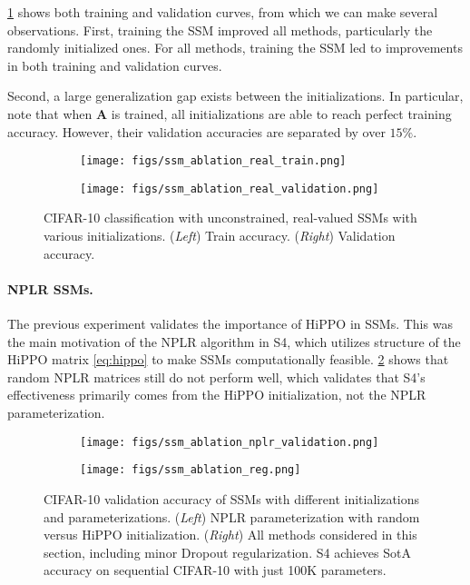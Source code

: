 \cref{fig:ssm-ablation-real} shows both training and validation curves, from which we can make several observations.
First, training the SSM improved all methods, particularly the randomly initialized ones.
For all methods, training the SSM led to improvements in both training and validation curves.

Second, a large generalization gap exists between the initializations.
In particular, note that when \( \bm{A} \) is trained, all initializations are able to reach perfect training accuracy.
However, their validation accuracies are separated by over \( 15\% \).

\begin{figure}[!ht]
\begin{subfigure}{.5\linewidth}%
    \centering
    \texttt{[image: figs/ssm\_ablation\_real\_train.png]}
\end{subfigure}
\begin{subfigure}{.5\linewidth}%
    \centering
    \texttt{[image: figs/ssm\_ablation\_real\_validation.png]}
\end{subfigure}
\caption{CIFAR-10 classification with unconstrained, real-valued SSMs with various initializations. (\emph{Left}) Train accuracy. (\emph{Right}) Validation accuracy.}
\label{fig:ssm-ablation-real}
\end{figure}

\paragraph{NPLR SSMs.}
The previous experiment validates the importance of HiPPO in SSMs.
This was the main motivation of the NPLR algorithm in S4,
which utilizes structure of the HiPPO matrix \eqref{eq:hippo} to make SSMs computationally feasible.
\cref{fig:ssm-ablation-nplr} shows that random NPLR matrices still do not perform well,
which validates that S4's effectiveness primarily comes from the HiPPO initialization, not the NPLR parameterization.

\begin{figure}[!t]
\begin{subfigure}{.5\linewidth}%
    \centering
    \texttt{[image: figs/ssm\_ablation\_nplr\_validation.png]}
    \caption{}
    \label{fig:ssm-ablation-nplr}
\end{subfigure}
\begin{subfigure}{.5\linewidth}%
    \centering
    \texttt{[image: figs/ssm\_ablation\_reg.png]}
    \caption{}
    \label{fig:ssm-ablation-reg}
\end{subfigure}
\caption{
  CIFAR-10 validation accuracy of SSMs with different initializations and parameterizations.
  (\emph{Left}) NPLR parameterization with random versus HiPPO initialization.
  (\emph{Right}) All methods considered in this section, including minor Dropout regularization. S4 achieves SotA accuracy on sequential CIFAR-10 with just 100K parameters.
}
\end{figure}

